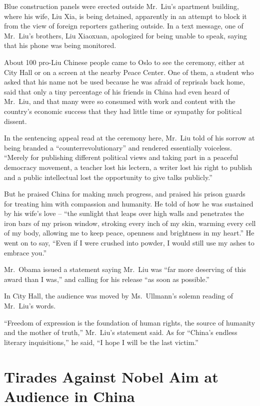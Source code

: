 ﻿\documentclass[12pt]{article}
\begin{document}
Blue construction panels were erected outside Mr.~Liu's apartment building, where his wife, Liu Xia,
is being detained, apparently in an attempt to block it from the view of foreign reporters gathering
outside. In a text message, one of Mr.~Liu's brothers, Liu Xiaoxuan, apologized for being unable to
speak, saying that his phone was being monitored.

About 100 pro-Liu Chinese people came to Oslo to see the ceremony, either at City Hall or on a
screen at the nearby Peace Center. One of them, a student who asked that his name not be used
because he was afraid of reprisals back home, said that only a tiny percentage of his friends in
China had even heard of Mr.~Liu, and that many were so consumed with work and content with the
country's economic success that they had little time or sympathy for political dissent.

In the sentencing appeal read at the ceremony here, Mr.~Liu told of his sorrow at being branded a
``counterrevolutionary'' and rendered essentially voiceless. ``Merely for publishing different
political views and taking part in a peaceful democracy movement, a teacher lost his lectern, a
writer lost his right to publish and a public intellectual lost the opportunity to give talks
publicly.''

But he praised China for making much progress, and praised his prison guards for treating him with
compassion and humanity. He told of how he was sustained by his wife's love -- ``the sunlight that
leaps over high walls and penetrates the iron bars of my prison window, stroking every inch of my
skin, warming every cell of my body, allowing me to keep peace, openness and brightness in my
heart.'' He went on to say, ``Even if I were crushed into powder, I would still use my ashes to
embrace you.''

Mr.~Obama issued a statement saying Mr.~Liu was ``far more deserving of this award than I was,'' and
calling for his release ``as soon as possible.''

In City Hall, the audience was moved by Ms.~Ullmann's solemn reading of Mr.~Liu's words.

``Freedom of expression is the foundation of human rights, the source of humanity and the mother of
truth,'' Mr.~Liu's statement said. As for ``China's endless literary inquisitions,'' he said, ``I
hope I will be the last victim.''

\section{Tirades Against Nobel Aim at Audience in China}
\end{document}
